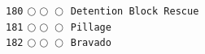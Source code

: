 \documentclass[a4paper,landscape]{article}
\begin{document}
\begin{multicols*}{5}
\texttt{180} \(\bigcirc\!\bigcirc\!\bigcirc\)  \texttt{Detention Block Rescue} \vspace{-0.3mm}\\ 
\texttt{181} \(\bigcirc\!\bigcirc\!\bigcirc\)  \texttt{Pillage} \vspace{-0.3mm}\\ 
\texttt{182} \(\bigcirc\!\bigcirc\!\bigcirc\)  \texttt{Bravado} \vspace{-0.3mm}\\ 

\end{multicols*}
\end{document}
